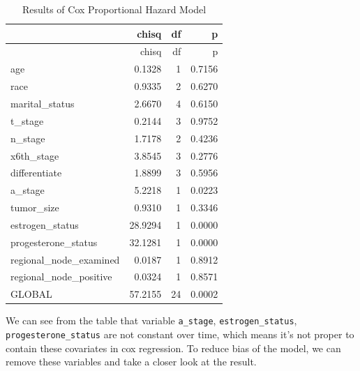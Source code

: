 \documentclass[
]{article}
\begin{document}
\begin{longtable}[]{@{}lrrr@{}}
\caption{Results of Cox Proportional Hazard Model}\tabularnewline
\toprule\noalign{}
& chisq & df & p \\
\midrule\noalign{}
\endfirsthead
\toprule\noalign{}
& chisq & df & p \\
\midrule\noalign{}
\endhead
\bottomrule\noalign{}
\endlastfoot
age & 0.1328 & 1 & 0.7156 \\
race & 0.9335 & 2 & 0.6270 \\
marital\_status & 2.6670 & 4 & 0.6150 \\
t\_stage & 0.2144 & 3 & 0.9752 \\
n\_stage & 1.7178 & 2 & 0.4236 \\
x6th\_stage & 3.8545 & 3 & 0.2776 \\
differentiate & 1.8899 & 3 & 0.5956 \\
a\_stage & 5.2218 & 1 & 0.0223 \\
tumor\_size & 0.9310 & 1 & 0.3346 \\
estrogen\_status & 28.9294 & 1 & 0.0000 \\
progesterone\_status & 32.1281 & 1 & 0.0000 \\
regional\_node\_examined & 0.0187 & 1 & 0.8912 \\
regional\_node\_positive & 0.0324 & 1 & 0.8571 \\
GLOBAL & 57.2155 & 24 & 0.0002 \\
\end{longtable}

We can see from the table that variable \texttt{a\_stage},
\texttt{estrogen\_status}, \texttt{progesterone\_status} are not
constant over time, which means it's not proper to contain these
covariates in cox regression. To reduce bias of the model, we can remove
these variables and take a closer look at the result.
\end{document}
